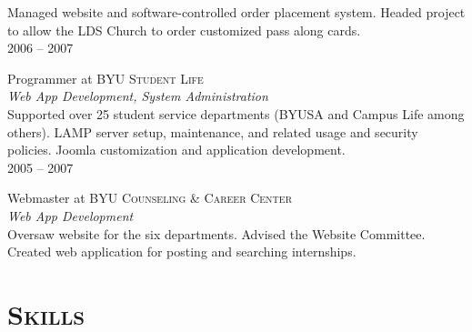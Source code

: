 \documentclass[10pt]{article}
\begin{document}
{\begin{minipage}[t]{0.5\textwidth}
  \normalsize{
  Managed website and software-controlled order placement system.
  Headed project to allow the LDS Church to order customized pass along cards. 
  }\\[10pt]

	\raggedleft
	\textsc{\normalsize 2006 -- 2007}\par

	\raggedright\large Programmer at \textsc{BYU Student Life}\\
	\emph{Web App Development, System Administration}\\[5pt]

	\normalsize{
  Supported over 25 student service departments (BYUSA and Campus Life among others). 
  LAMP server setup, maintenance, and related usage and security policies. 
  Joomla customization and application development. 
  }\\[10pt]

	\raggedleft
	\textsc{\normalsize 2005 -- 2007}\par

	\raggedright\large Webmaster at \textsc{BYU Counseling \& Career Center}\\
	\emph{Web App Development}\\[5pt]

	\normalsize{
  Oversaw website for the six departments.
  Advised the Website Committee.
  Created web application for posting and searching internships.
  }\\[10pt]

%	
%
\section{\textsc{Skills}}


\end{minipage}}
\end{document}
